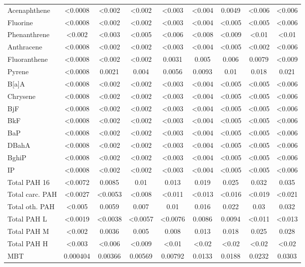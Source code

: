 \documentclass[algorithms,article,submit,pdftex,moreauthors]{Definitions/mdpi}
\begin{document}
\begin{scriptsize}
\begin{center}
\begin{longtable}{@{\extracolsep{\fill}}|p{1.8cm}|cccccccc|@{}}
Acenaphthene & <0.0008 & <0.002 & <0.002 & <0.003 & <0.004 & 0.0049 & <0.006 & <0.006 \\
Fluorine & <0.0008 &  <0.002 &  <0.002 &  <0.003 &  <0.004 &  <0.005 &  <0.005 &  <0.006 \\
Phenanthrene & <0.002 & <0.003 & <0.005 & <0.006 & <0.008 & <0.009 & <0.01 & <0.01 \\
Anthracene & <0.0008 & <0.002 & <0.002 & <0.003 & <0.004 & <0.005 & <0.002 & <0.006 \\
Fluoranthene & <0.0008 & <0.002 & <0.002 & 0.0031 & 0.005 & 0.006 & 0.0079 & <0.009 \\
Pyrene & <0.0008 & 0.0021 & 0.004 & 0.0056 & 0.0093 & 0.01 & 0.018 & 0.021 \\
B[a]A & <0.0008 & <0.002 & <0.002 & <0.003 & <0.004 & <0.005 & <0.005 & <0.006 \\
Chrysene & <0.0008 & <0.002 & <0.002 & <0.003 & <0.004 & <0.005 & <0.005 & <0.006 \\
BjF & <0.0008 & <0.002 & <0.002 & <0.003 & <0.004 & <0.005 & <0.005 & <0.006 \\
BkF & <0.0008 & <0.002 & <0.002 & <0.003 & <0.004 & <0.005 & <0.005 & <0.006 \\
BaP & <0.0008 & <0.002 & <0.002 & <0.003 & <0.004 & <0.005 & <0.005 & <0.006 \\
DBahA & <0.0008 & <0.002 & <0.002 & <0.003 & <0.004 & <0.005 & <0.005 & <0.006 \\
BghiP & <0.0008 & <0.002 & <0.002 & <0.003 & <0.004 & <0.005 & <0.005 & <0.006 \\
IP & <0.0008 & <0.002 & <0.002 & <0.003 & <0.004 & <0.005 & <0.005 & <0.006 \\
Total PAH 16 & <0.0072 & 0.0085 & 0.01 & 0.013 & 0.019 & 0.025 & 0.032 & 0.035 \\
Total carc. PAH & <0.0027 & <0.0053 & <0.008 & <0.011 & <0.013 & <0.016 & <0.019 & <0.021 \\
Total oth. PAH & <0.005 & 0.0059 & 0.007 & 0.01 & 0.016 & 0.022 & 0.03 & 0.032 \\
Total PAH L & <0.0019 & <0.0038 & <0.0057 & <0.0076 & 0.0086 & 0.0094 & <0.011 & <0.013 \\
Total PAH M & <0.002 & 0.0036 & 0.005 & 0.008 & 0.013 & 0.018 & 0.025 & 0.028 \\
Total PAH H & <0.003 & <0.006 & <0.009 & <0.01 & <0.02 & <0.02 & <0.02 & <0.02 \\
MBT & 0.000404 & 0.00366 & 0.00569 & 0.00792 & 0.0133 & 0.0188 & 0.0232 & 0.0303 \\

\end{longtable}
\end{center}
\end{scriptsize}
\end{document}
